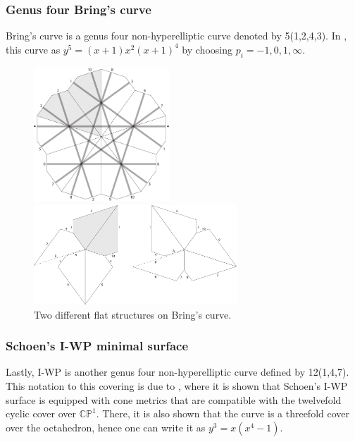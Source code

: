 \documentclass[12pt,reqno]{amsart}
\newcommand{\C}{\mathbb{C}}
\renewcommand{\P}{\mathbb{P}}
\theoremstyle{definition}
\theoremstyle{remark}
\begin{document}
\subsubsection{Genus four Bring's curve}
Bring's curve is a genus four non-hyperelliptic curve denoted by 5(1,2,4,3). In \cite{matti}, this curve as $y^5 = (x+1)x^2(x+1)^4$ by choosing $p_i = -1, 0, 1, \infty.$

\begin{figure}[htbp] %
\centering
\begin{minipage}{0.5\textwidth}
	\centering
	\includegraphics[width=2in]{figures/1243_flat.pdf}
\end{minipage}%
\begin{minipage}{0.5\textwidth}
	\centering
	\includegraphics[width=3in]{figures/1243_flat_2.pdf}
\end{minipage}
	\caption{Two different flat structures on Bring's curve.}
	\label{fig:1243}
\end{figure}

\subsubsection{Schoen's I-WP minimal surface}
Lastly, I-WP is another genus four non-hyperelliptic curve defined by 12(1,4,7). This notation to this covering is due to \cite{dthesis}, where it is shown that Schoen's I-WP surface is equipped with cone metrics that are compatible with the twelvefold cyclic cover over $\C\P^1.$ There, it is also shown that the curve is a threefold cover over the octahedron, hence one can write it as $y^3 = x (x^4 -1).$
\end{document}

